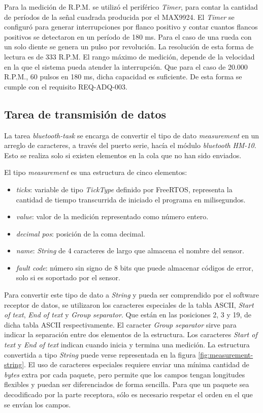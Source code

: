 Para la medición de R.P.M. se utilizó el periférico \textit{Timer}, para contar la cantidad de períodos de la señal cuadrada producida por el MAX9924. El \textit{Timer} se configuró para generar interrupciones por flanco positivo y contar cuantos flancos positivos se detectaron en un período de 180 ms. Para el caso de una rueda con un solo diente se genera un pulso por revolución. La resolución de esta forma de lectura es de 333 R.P.M. El rango máximo de medición, depende de la velocidad en la que el sistema pueda atender la interrupción. Que para el caso de 20.000 R.P.M., 60 pulsos en 180 ms, dicha capacidad es suficiente. De esta forma se cumple con el requisito REQ-ADQ-003.

\subsection{Tarea de transmisión de datos}

La tarea \textit{bluetooth-task} se encarga de convertir el tipo de dato \textit{measurement} en un arreglo de caracteres, a través del puerto serie, hacía el módulo \textit{bluetooth} \textit{HM-10}. Esto se realiza solo si existen elementos en la cola que no han sido enviados.

El tipo \textit{measurement} es una estructura de cinco elementos:

\begin{itemize}
\item{\textit{ticks}:} variable de tipo \textit{TickType} definido por FreeRTOS, representa la cantidad de tiempo transcurrida de iniciado el programa en milisegundos.
\item{\textit{value}:} valor de la medición representado como número entero.
\item{\textit{decimal pos}:} posición de la coma decimal.
\item{\textit{name}:} \textit{String} de 4 caracteres de largo que almacena el nombre del sensor.
\item{\textit{fault code}:} número sin signo de 8 bits que puede almacenar códigos de error, solo si es soportado por el sensor.
\end{itemize}

Para convertir este tipo de dato a \textit{String} y pueda ser comprendido por el software receptor de datos, se utilizaron los caracteres especiales de la tabla ASCII, \textit{Start of text}, \textit{End of text} y \textit{Group separator}. Que están en las posiciones 2, 3 y 19, de dicha tabla ASCII respectivamente. El caracter \textit{Group separator} sirve para indicar la separación entre dos elementos de la estructura. Los caracteres \textit{Start of text} y \textit{End of text} indican cuando inicia y termina una medición. La estructura convertida a tipo \textit{String} puede verse representada en la figura \ref{fig:measurement-string}. El uso de caracteres especiales requiere enviar una mínima cantidad de \textit{bytes} extra por cada paquete, pero permite que los campos tengan longitudes flexibles y puedan ser diferenciados de forma sencilla. Para que un paquete sea decodificado por la parte receptora, sólo es necesario respetar el orden en el que se envían los campos.

